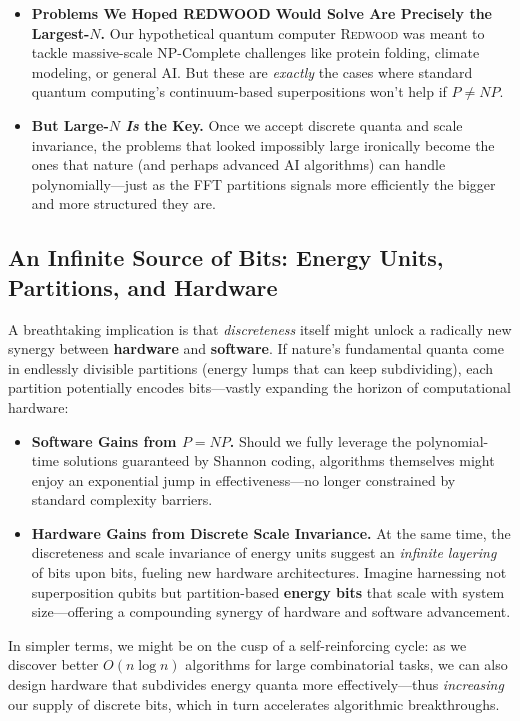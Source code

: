 \documentclass{report}
\begin{document}
\begin{itemize}
\item \textbf{Problems We Hoped REDWOOD Would Solve Are Precisely the Largest-$N$.} 
  Our hypothetical quantum computer \textsc{Redwood} was meant to tackle massive-scale NP-Complete challenges like protein folding, climate modeling, or general AI. But these are \emph{exactly} the cases where standard quantum computing’s continuum-based superpositions won’t help if $P \neq NP$. 
\item \textbf{But Large-$N$ \emph{Is} the Key.} 
  Once we accept discrete quanta and scale invariance, the problems that looked impossibly large ironically become the ones that nature (and perhaps advanced AI algorithms) can handle polynomially—just as the FFT partitions signals more efficiently the bigger and more structured they are. 
\end{itemize}

\subsection*{An Infinite Source of Bits: Energy Units, Partitions, and Hardware}
A breathtaking implication is that \emph{discreteness} itself might unlock a radically new synergy between \textbf{hardware} and \textbf{software}. If nature’s fundamental quanta come in endlessly divisible partitions (energy lumps that can keep subdividing), each partition potentially encodes bits—vastly expanding the horizon of computational hardware:

\begin{itemize}
\item \textbf{Software Gains from $P=NP$.} 
  Should we fully leverage the polynomial-time solutions guaranteed by Shannon coding, algorithms themselves might enjoy an exponential jump in effectiveness—no longer constrained by standard complexity barriers. 
\item \textbf{Hardware Gains from Discrete Scale Invariance.}
  At the same time, the discreteness and scale invariance of energy units suggest an \emph{infinite layering} of bits upon bits, fueling new hardware architectures. Imagine harnessing not superposition qubits but partition-based \textbf{energy bits} that scale with system size—offering a compounding synergy of hardware and software advancement.
\end{itemize}

In simpler terms, we might be on the cusp of a self-reinforcing cycle: as we discover better $O(n \log n)$ algorithms for large combinatorial tasks, we can also design hardware that subdivides energy quanta more effectively—thus \emph{increasing} our supply of discrete bits, which in turn accelerates algorithmic breakthroughs.
\end{document}
